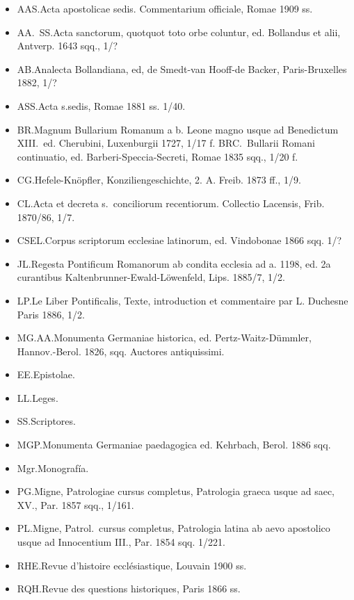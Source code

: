 \raggedbottom{} \documentclass[12pt, a4paper]{book}
\begin{document}
\begin{itemize}
  \item AAS.\@ Acta apostolicae sedis. Commentarium officiale, Romae 1909 ss.
  \item AA.\ SS.\@ Acta sanctorum, quotquot toto orbe coluntur, ed. Bollandus et alii, Antverp. 1643 sqq., 1/?
  \item AB.\@ Analecta Bollandiana, ed, de Smedt-van Hooff-de Backer, Paris-Bruxelles 1882, 1/?
  \item ASS.\@ Acta s.\@ sedis, Romae 1881 ss. 1/40.
  \item BR.\@ Magnum Bullarium Romanum a b. Leone magno usque ad Benedictum XIII.\ ed. Cherubini, Luxenburgii 1727, 1/17 f. BRC.\ Bullarii Romani continuatio, ed. Barberi-Speccia-Secreti, Romae 1835 sqq., 1/20 f.
  \item CG.\@ Hefele-Knöpfler, Konziliengeschichte, 2. A. Freib. 1873 ff., 1/9.
  \item CL.\@ Acta et decreta s.\ conciliorum recentiorum. Collectio Lacensis, Frib. 1870/86, 1/7.
  \item CSEL.\@ Corpus scriptorum ecclesiae latinorum, ed. Vindobonae 1866 sqq. 1/?
  \item JL.\@ Regesta Pontificum Romanorum ab condita ecclesia ad a. 1198, ed. 2a curantibus Kaltenbrunner-Ewald-Löwenfeld, Lips. 1885/7, 1/2.
  \item LP.\@ Le Liber Pontificalis, Texte, introduction et commentaire par L. Duchesne Paris 1886, 1/2.
  \item MG.\@ AA.\@ Monumenta Germaniae historica, ed. Pertz-Waitz-Dümmler, Hannov.-Berol. 1826, sqq. Auctores antiquissimi.
  \item EE.\@ Epistolae.
  \item LL.\@ Leges.
  \item SS.\@ Scriptores.
  \item MGP.\@ Monumenta Germaniae paedagogica ed. Kehrbach, Berol. 1886 sqq.
  \item Mgr.\@ Monografía.

  \item PG.\@ Migne, Patrologiae cursus completus, Patrologia graeca usque ad saec, XV., Par. 1857 sqq., 1/161.

  \item PL.\@ Migne, Patrol.\ cursus completus, Patrologia latina ab aevo apostolico usque ad Innocentium III., Par. 1854 sqq. 1/221.
  \item RHE.\@ Revue d'histoire ecclésiastique, Louvain 1900 ss.
  \item RQH.\@ Revue des questions historiques, Paris 1866 ss.
\end{itemize}
\end{document}
